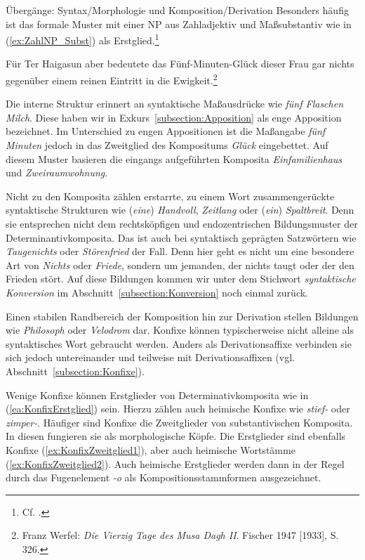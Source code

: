\begin{Exkurs}{Übergänge: Syntax/Morphologie und Komposition/Derivation}
Besonders häufig ist das formale Muster mit einer NP aus Zahladjektiv und Maßsubstantiv wie in (\ref{ex:ZahlNP_Subst}) als Erstglied.\footnote{Cf. \citet[43]{Ortner_Komposita1991}.}

\ea \label{ex:ZahlNP_Subst} Für Ter Haigasun aber bedeutete das Fünf-Minuten-Glück dieser Frau gar nichts gegenüber einem reinen Eintritt in die Ewigkeit.\footnote{Franz Werfel: \textit{Die Vierzig Tage des Musa Dagh II}. Fischer 1947 [1933], S. 326.}
\z 

Die interne Struktur erinnert an syntaktische Maßausdrücke wie \textit{fünf Flaschen Milch}. Diese haben wir in Exkurs~\ref{subsection:Apposition} als enge Apposition bezeichnet. Im Unterschied zu engen Appositionen ist die Maßangabe \textit{fünf Minuten} jedoch in das Zweitglied des Kompositums \textit{Glück} eingebettet. Auf diesem Muster basieren die eingangs aufgeführten Komposita \textit{Einfamilienhaus} und \textit{Zweiraumwohnung}.

Nicht zu den Komposita zählen erstarrte, zu einem Wort zusammengerückte syntaktische Strukturen wie (\textit{eine}) \textit{Handvoll}, \textit{Zeitlang} oder (\textit{ein}) \textit{Spaltbreit}. Denn sie entsprechen nicht dem rechtsköpfigen und endozentrischen Bildungsmuster der Determinantivkomposita. Das ist auch bei syntaktisch geprägten Satzwörtern wie \textit{Taugenichts} oder \textit{Störenfried} der Fall. Denn hier geht es nicht um eine besondere Art von \textit{Nichts} oder \textit{Friede}, sondern um jemanden, der nichts taugt oder der den Frieden stört. Auf diese Bildungen kommen wir unter dem Stichwort \textit{syntaktische Konversion} im Abschnitt~\ref{subsection:Konversion} noch einmal zurück.  


Einen stabilen Randbereich der Komposition hin zur Derivation stellen Bildungen wie \textit{Philosoph} oder \textit{Velodrom} dar. Konfixe können typischerweise nicht alleine als syntaktisches Wort gebraucht werden. Anders als Derivationsaffixe verbinden sie sich jedoch untereinander und teilweise mit Derivationsaffixen (vgl. Abschnitt~\ref{subsection:Konfixe}). 

Wenige Konfixe können Erstglieder von Determinativkomposita wie in (\ref{ea:KonfixErstglied}) sein. Hierzu zählen auch heimische Konfixe wie \textit{stief-} oder \textit{zimper-}. Häufiger sind Konfixe die Zweitglieder von substantivischen Komposita. In diesen fungieren sie als morphologische Köpfe. Die Erstglieder sind ebenfalls Konfixe (\ref{ex:KonfixZweitglied1}), aber auch heimische Wortstämme (\ref{ex:KonfixZweitglied2}). Auch heimische Erstglieder werden dann in der Regel durch das Fugenelement \textit{-o} als Kompositionsstammformen ausgezeichnet.  


\end{Exkurs}
